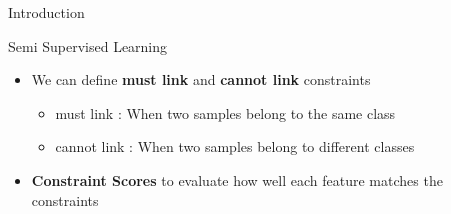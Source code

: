 \documentclass{beamer}
\begin{document}
\begin{frame}{Introduction}
    \begin{block}{Semi Supervised Learning}
        \begin{itemize}
            \item We can define \textbf{must link} and \textbf{cannot link} constraints
                \begin{itemize}
                    \item must link : When two samples belong to the same class
                    \item cannot link : When two samples belong to different classes
                \end{itemize}
            \item \textbf{Constraint Scores} to evaluate how well each feature matches the constraints
        \end{itemize}
    \end{block}
\end{frame}
\end{document}
